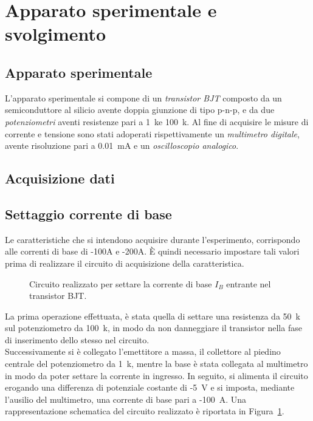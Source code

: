 \documentclass[../main.tex]{subfiles}
\begin{document}
    \section{Apparato sperimentale e svolgimento} \label{sec:acquisizione}

    \subsection{Apparato sperimentale}\label{subsec:apparato-sperimentale}

    L'apparato sperimentale si compone di un \textit{transistor BJT} composto da un
    semiconduttore al silicio avente doppia giunzione di tipo p-n-p, e da due
    \textit{potenziometri} aventi resistenze pari a 1~\;k\textohm\;e 100~\;k\textohm. Al fine di acquisire
    le misure di corrente e tensione sono stati adoperati rispettivamente un \textit{multimetro digitale},
    avente risoluzione pari a 0.01~\;mA e un \textit{oscilloscopio analogico}.
\newpage
    \subsection{Acquisizione dati}\label{subsec:acquisizione-dati}
    \vspace{0.2cm}
    \subsection*{Settaggio corrente di base}

    Le caratteristiche che si intendono acquisire durante l'esperimento, corrispondo alle correnti
    di base di -100\;\textmu A e -200\;\textmu A. È quindi necessario impostare tali valori prima di realizzare
    il circuito di acquisizione della caratteristica.

    \begin{figure}[h!]
        \centering
        
        \caption{Circuito realizzato per settare la corrente di base $I_B$ entrante nel transistor BJT.}
        \label{fig:circuito-corrente-base}
    \end{figure}
    
    \noindent La prima operazione effettuata, è stata quella di settare una resistenza da 50~\;k\textohm\;
    sul potenziometro da 100~\;k\textohm, in modo da non danneggiare il
    transistor nella fase di inserimento dello stesso nel circuito. \\
    Successivamente si è collegato l'emettitore a massa, il collettore al piedino centrale
    del potenziometro da 1~\;k\textohm, mentre la base è stata collegata al multimetro
    in modo da poter settare la corrente in ingresso. In seguito, si alimenta il circuito erogando
    una differenza di potenziale costante di -5~V e si imposta, mediante l'ausilio del multimetro,
    una corrente di base pari a -100~\;\textmu A. Una rappresentazione schematica del circuito realizzato
    è riportata in Figura~\ref{fig:circuito-corrente-base}.
\end{document}
